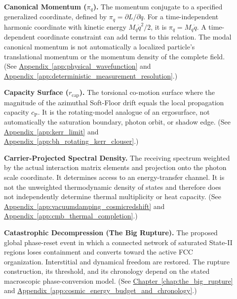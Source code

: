 \begin{description}
\item[] \begin{minipage}[t]{\linewidth}
\textbf{Canonical Momentum ($\pi_q$).} The momentum conjugate to a specified generalized coordinate, defined by $\pi_q=\partial L/\partial\dot q$. For a time-independent harmonic coordinate with kinetic energy $M_q\dot q^2/2$, it is $\pi_q=M_q\dot q$. A time-dependent coordinate constraint can add terms to this relation. The modal canonical momentum is not automatically a localized particle's translational momentum or the momentum density of the complete field.
(See \hyperref[app:physical_wavefunction]{Appendix~\ref*{app:physical_wavefunction}} and \hyperref[app:deterministic_measurement_resolution]{Appendix~\ref*{app:deterministic_measurement_resolution}}.)
\end{minipage}

\item[] \begin{minipage}[t]{\linewidth}
\textbf{Capacity Surface ($r_{\mathrm{cap}}$).} The torsional co-motion surface where the magnitude of the azimuthal Soft-Floor drift equals the local propagation capacity $c_{\mathrm P}$. It is the rotating-model analogue of an ergosurface, not automatically the saturation boundary, photon orbit, or shadow edge.
(See \hyperref[app:kerr_limit]{Appendix~\ref*{app:kerr_limit}} and \hyperref[app:bh_rotating_kerr_clouser]{Appendix~\ref*{app:bh_rotating_kerr_clouser}}.)
\end{minipage}

\item[] \begin{minipage}[t]{\linewidth}
\textbf{Carrier-Projected Spectral Density.} The receiving spectrum weighted by the actual interaction matrix elements and projection onto the photon scale coordinate. It determines access to an energy-transfer channel. It is not the unweighted thermodynamic density of states and therefore does not independently determine thermal multiplicity or heat capacity.
(See \hyperref[app:vacuumdamping_cosmicredshift]{Appendix~\ref*{app:vacuumdamping_cosmicredshift}} and \hyperref[app:cmb_thermal_completion]{Appendix~\ref*{app:cmb_thermal_completion}}.)
\end{minipage}

\item[] \begin{minipage}[t]{\linewidth}
\textbf{Catastrophic Decompression (The Big Rupture).} The proposed global phase-reset event in which a connected network of saturated State-II regions loses containment and converts toward the active FCC organization. Interstitial and dynamical freedom are restored. The rupture construction, its threshold, and its chronology depend on the stated macroscopic phase-conversion model.
(See \hyperref[chap:the_big_rupture]{Chapter~\ref*{chap:the_big_rupture}} and \hyperref[app:cosmic_energy_budget_and_chronology]{Appendix~\ref*{app:cosmic_energy_budget_and_chronology}}.)
\end{minipage}


\end{description}
